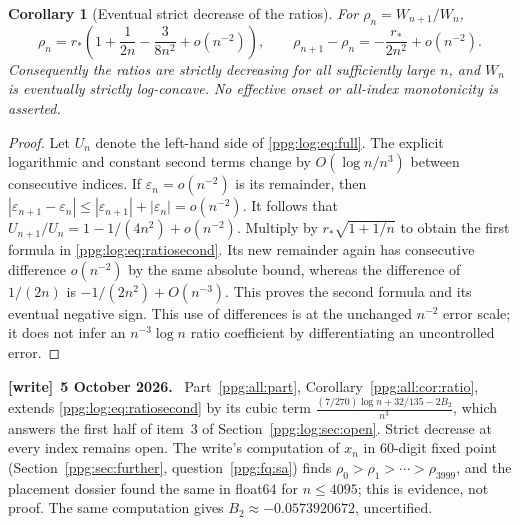 \documentclass[11pt,letterpaper]{article}
\newtheorem{corollary}[theorem]{Corollary}
\theoremstyle{remark}\newtheorem{remark}[theorem]{Remark}
\numberwithin{equation}{section}
\newenvironment{writenote}[1][]{\par\smallskip\begingroup\small
 \noindent\textbf{[write]}\if\relax\detokenize{#1}\relax\else~\textbf{#1.}\fi\ }%
 {\par\endgroup\smallskip}
\begin{document}
\begin{corollary}[Eventual strict decrease of the ratios]\label{ppg:log:cor:monotonicity}
For $\rho_n=W_{n+1}/W_n$,
\begin{equation}\label{ppg:log:eq:ratiosecond}
 \rho_n=r_*\left(1+\frac1{2n}-\frac3{8n^2}+o(n^{-2})\right),
 \qquad \rho_{n+1}-\rho_n=-\frac{r_*}{2n^2}+o(n^{-2}).
\end{equation}
Consequently the ratios are strictly decreasing for all sufficiently large $n$, and $W_n$ is eventually strictly log-concave. No effective onset or all-index monotonicity is asserted.
\end{corollary}
\begin{proof}
Let $U_n$ denote the left-hand side of \eqref{ppg:log:eq:full}. The explicit logarithmic and constant second terms change by $O(\log n/n^3)$ between consecutive indices. If $\varepsilon_n=o(n^{-2})$ is its remainder, then
$|\varepsilon_{n+1}-\varepsilon_n|\le|\varepsilon_{n+1}|+|\varepsilon_n|=o(n^{-2})$.
It follows that $U_{n+1}/U_n=1-1/(4n^2)+o(n^{-2})$. Multiply by $r_*\sqrt{1+1/n}$ to obtain the first formula in \eqref{ppg:log:eq:ratiosecond}. Its new remainder again has consecutive difference $o(n^{-2})$ by the same absolute bound, whereas the difference of $1/(2n)$ is $-1/(2n^2)+O(n^{-3})$. This proves the second formula and its eventual negative sign. This use of differences is at the unchanged $n^{-2}$ error scale; it does not infer an $n^{-3}\log n$ ratio coefficient by differentiating an uncontrolled error.
\end{proof}
\begin{writenote}[5 October 2026]
Part~\ref{ppg:all:part}, Corollary~\ref{ppg:all:cor:ratio}, extends \eqref{ppg:log:eq:ratiosecond} by its cubic term $\frac{(7/270)\log n+32/135-2B_2}{n^3}$, which answers the first half of item~3 of Section~\ref{ppg:log:sec:open}. Strict decrease at every index remains open. The write's computation of $x_n$ in 60-digit fixed point (Section~\ref{ppg:sec:further}, question~\ref{ppg:fq:sa}) finds $\rho_0>\rho_1>\cdots>\rho_{3999}$, and the placement dossier found the same in float64 for $n\le4095$; this is evidence, not proof. The same computation gives $B_2\approx-0.0573920672$, uncertified.
\end{writenote}
\end{document}
